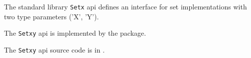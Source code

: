 
The standard library {\tt Setx} api defines an interface for set implementations with two type parameters ('X', 'Y').

The {\tt Setxy} api is implemented by the 
 package.

The {\tt Setxy} api source code is in .
